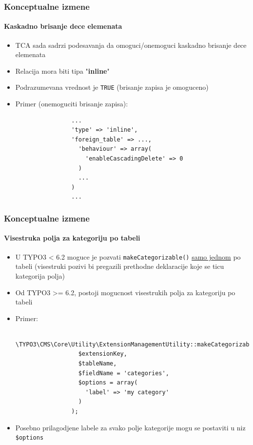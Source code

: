 
\begin{frame}[fragile]
	\frametitle{Konceptualne izmene}
	\framesubtitle{Kaskadno brisanje dece elemenata}

	\begin{itemize}
		\item TCA sada sadrzi podesavanja da omoguci/onemoguci kaskadno brisanje dece elemenata
		\item Relacija mora biti tipa "\textbf{inline}"
		\item Podrazumevana vrednost je \texttt{TRUE} (brisanje zapisa je omoguceno)
		\item Primer (onemoguciti brisanje zapisa):

			\begin{lstlisting}
				...
				'type' => 'inline',
				'foreign_table' => ...,
				  'behaviour' => array(
				    'enableCascadingDelete' => 0
				  )
				  ...
				)
				...
			\end{lstlisting}

	\end{itemize}

\end{frame}


\begin{frame}[fragile]
	\frametitle{Konceptualne izmene}
	\framesubtitle{Visestruka polja za kategoriju po tabeli}

	\begin{itemize}
		\item U TYPO3 < 6.2 moguce je pozvati \texttt{makeCategorizable()} \underline{samo jednom} po tabeli
			(visestruki pozivi bi pregazili prethodne deklaracije koje se ticu kategorija polja)
		\item Od TYPO3 >= 6.2, postoji mogucnost visestrukih polja za kategoriju po tabeli
		\item Primer:

			\begin{lstlisting}
				\TYPO3\CMS\Core\Utility\ExtensionManagementUtility::makeCategorizable(
				  $extensionKey,
				  $tableName,
				  $fieldName = 'categories',
				  $options = array(
				  	'label' => 'my category'
				  )
				);
			\end{lstlisting}

		\item Posebno prilagodjene labele za svako polje kategorije mogu se postaviti u niz \texttt{\$options}

	\end{itemize}

\end{frame}

